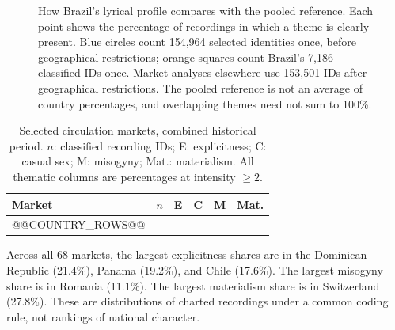 \documentclass[10pt,a4paper,twocolumn]{article}
\begin{document}
\begin{figure}[t]
\centering
{}
\caption{How Brazil's lyrical profile compares with the pooled reference. Each point shows the percentage of recordings in which a theme is clearly present. Blue circles count 154,964 selected identities once, before geographical restrictions; orange squares count Brazil's 7,186 classified IDs once. Market analyses elsewhere use 153,501 IDs after geographical restrictions. The pooled reference is not an average of country percentages, and overlapping themes need not sum to 100\%.}
\label{fig:themes}
\end{figure}

\begin{table}[t]
\caption{Selected circulation markets, combined historical period. $n$: classified recording IDs; E: explicitness; C: casual sex; M: misogyny; Mat.: materialism. All thematic columns are percentages at intensity $\geq2$.}
\label{tab:markets}
\centering\footnotesize\setlength{\tabcolsep}{3.5pt}
\begin{tabular}{@{}lrrrrr@{}}
\toprule Market & $n$ & E & C & M & Mat.\\
\midrule
@@COUNTRY_ROWS@@
\bottomrule
\end{tabular}
\end{table}

Across all 68 markets, the largest explicitness shares are in the Dominican Republic (21.4\%), Panama (19.2\%), and Chile (17.6\%). The largest misogyny share is in Romania (11.1\%). The largest materialism share is in Switzerland (27.8\%). These are distributions of charted recordings under a common coding rule, not rankings of national character.
\end{document}
